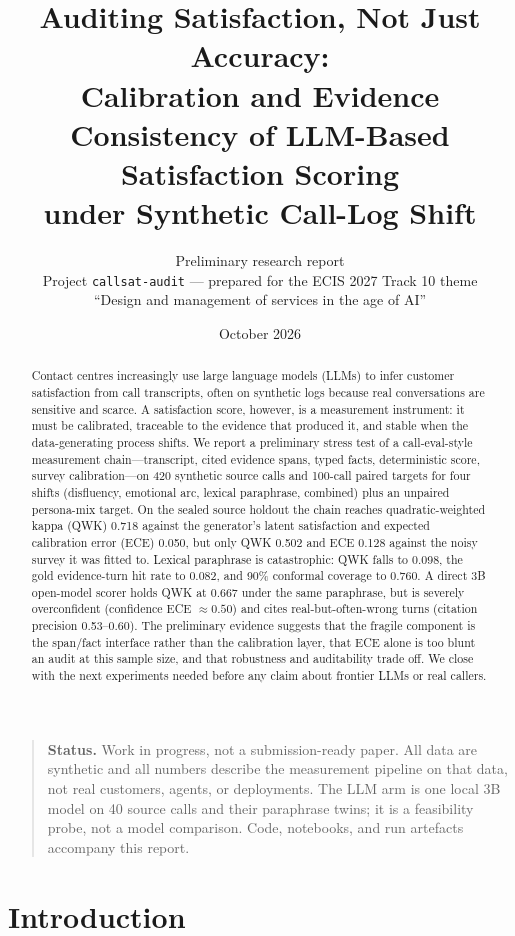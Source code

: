 \documentclass[11pt,a4paper]{article}
\title{\bfseries Auditing Satisfaction, Not Just Accuracy:\\[0.25em]
Calibration and Evidence Consistency of LLM-Based Satisfaction Scoring\\[0.15em]
under Synthetic Call-Log Shift}
\author{Preliminary research report\\[0.2em]
\small Project \texttt{callsat-audit} --- prepared for the ECIS 2027 Track 10 theme\\
\small ``Design and management of services in the age of AI''}
\date{October 2026}
\begin{document}
\maketitle

\begin{abstract}
Contact centres increasingly use large language models (LLMs) to infer customer satisfaction
from call transcripts, often on synthetic logs because real conversations are sensitive and
scarce. A satisfaction score, however, is a measurement instrument: it must be calibrated,
traceable to the evidence that produced it, and stable when the data-generating process shifts.
We report a preliminary stress test of a call-eval-style measurement chain---transcript,
cited evidence spans, typed facts, deterministic score, survey calibration---on 420 synthetic
source calls and 100-call paired targets for four shifts (disfluency, emotional arc, lexical
paraphrase, combined) plus an unpaired persona-mix target. On the sealed source holdout the
chain reaches quadratic-weighted kappa (QWK) 0.718 against the generator's latent satisfaction
and expected calibration error (ECE) 0.050, but only QWK 0.502 and ECE 0.128 against the noisy
survey it was fitted to. Lexical paraphrase is catastrophic: QWK falls to 0.098, the gold
evidence-turn hit rate to 0.082, and 90\% conformal coverage to 0.760. A direct 3B open-model
scorer holds QWK at 0.667 under the same paraphrase, but is severely overconfident (confidence
ECE $\approx 0.50$) and cites real-but-often-wrong turns (citation precision 0.53--0.60).
The preliminary evidence suggests that the fragile component is the span/fact interface rather
than the calibration layer, that ECE alone is too blunt an audit at this sample size, and that
robustness and auditability trade off. We close with the next experiments needed before any
claim about frontier LLMs or real callers.
\end{abstract}

\begin{quote}
\small
\textbf{Status.} Work in progress, not a submission-ready paper. All data are synthetic and all
numbers describe the measurement pipeline on that data, not real customers, agents, or
deployments. The LLM arm is one local 3B model on 40 source calls and their paraphrase twins;
it is a feasibility probe, not a model comparison. Code, notebooks, and run artefacts accompany
this report.
\end{quote}

\section{Introduction}
\end{document}
